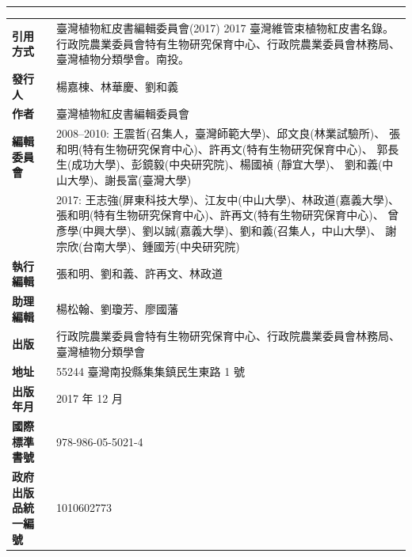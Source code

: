 \clearpage
\pagestyle{plain}
\thispagestyle{empty}
\linespread{1.5}
\noindent\huge \color{red}{2017 臺灣維管束植物紅皮書名錄} \\
\noindent\Large \color{red}{The Red List of Vascular Plants of Taiwan, 2017} \\
\normalsize
\hrule
\begin{table}[H]
  \tiny
  \Kai
  {\renewcommand\arraystretch{1.5}
  \begin{tabular}{>{\raggedleft\arraybackslash}p{3cm}p{8cm}}
      \textbf{引用方式}          & 臺灣植物紅皮書編輯委員會(2017) 
                                        2017 臺灣維管束植物紅皮書名錄。
                                        行政院農業委員會特有生物研究保育中心、行政院農業委員會林務局、臺灣植物分類學會。南投。\\
      \textbf{發行人}                 & 楊嘉棟、林華慶、劉和義 \\
      \textbf{作者}                   & 臺灣植物紅皮書編輯委員會 \\
      \textbf{編輯委員會}             & 2008--2010: 王震哲(召集人，臺灣師範大學)、邱文良(林業試驗所)、
                                        張和明(特有生物研究保育中心)、許再文(特有生物研究保育中心)、
                                        郭長生(成功大學)、彭鏡毅(中央研究院)、楊國禎 (靜宜大學)、
                                        劉和義(中山大學)、謝長富(臺灣大學) \\
                                      & 2017: 王志強(屏東科技大學)、江友中(中山大學)、林政道(嘉義大學)、
                                        張和明(特有生物研究保育中心)、許再文(特有生物研究保育中心)、
                                        曾彥學(中興大學)、劉以誠(嘉義大學)、劉和義(召集人，中山大學)、
                                        謝宗欣(台南大學)、鍾國芳(中央研究院) \\
      \textbf{執行編輯}          & 張和明、劉和義、許再文、林政道 \\
      \textbf{助理編輯}          & 楊松翰、劉瓊芳、廖國藩 \\
      \textbf{出版}              & 行政院農業委員會特有生物研究保育中心、行政院農業委員會林務局、臺灣植物分類學會 \\
      \textbf{地址}              & 55244 臺灣南投縣集集鎮民生東路 1 號 \\
      \textbf{出版年月}          & 2017 年 12 月 \\
      \textbf{國際標準書號}              & 978-986-05-5021-4 \\
      \textbf{政府出版品統一編號}        & 1010602773 \\

\end{tabular}}
\end{table}
